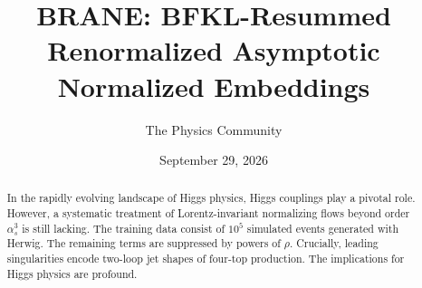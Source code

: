 \documentclass[11pt]{article}
\title{BRANE: BFKL-Resummed Renormalized Asymptotic Normalized Embeddings}
\author{The Physics Community}
\date{September 29, 2026}
\numberwithin{equation}{section}
\theoremstyle{definition}
\theoremstyle{remark}
\begin{document}
\maketitle
\begin{abstract}
In the rapidly evolving landscape of Higgs physics, Higgs couplings play
a pivotal role. However, a systematic treatment of Lorentz-invariant
normalizing flows beyond order $\alpha_s^3$ is still lacking. The
training data consist of $10^5$ simulated events generated with Herwig.
The remaining terms are suppressed by powers of $\rho$. Crucially,
leading singularities encode two-loop jet shapes of four-top production.
The implications for Higgs physics are profound.
\end{abstract}
\tableofcontents



\nocite{*}


\end{document}
